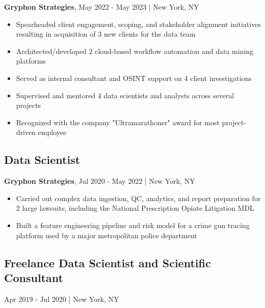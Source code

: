 \documentclass[11pt]{article}
\newenvironment{myitemize}
{ \begin{itemize}
	\setlength{\itemsep}{0pt}
	\setlength{\parskip}{0pt}
	\setlength{\parsep}{0pt}     }
{ \end{itemize}                  }
\begin{document}
{\bfseries Gryphon Strategies}, May 2022 - May 2023 | New York, NY
\begin{myitemize}
	\item Spearheaded client engagement, scoping, and stakeholder alignment initiatives resulting in acquisition of 3 new clients for the data team
	\item Architected/developed 2 cloud-based workflow automation and data mining platforms
	\item Served as internal consultant and OSINT support on 4 client investigations
	\item Supervised and mentored 4 data scientists and analysts across several projects
	\item Recognized with the company "Ultramarathoner" award for most project-driven employee
\end{myitemize}

\subsection*{Data Scientist}
\vspace{-3truemm}

{\bfseries Gryphon Strategies}, Jul 2020 - May 2022 | New York, NY
\begin{myitemize}
	\item Carried out complex data ingestion, QC, analytics, and report preparation for 2 large lawsuits, including the National Prescription Opiate Litigation MDL
	\item Built a feature engineering pipeline and risk model for a crime gun tracing platform used by a major metropolitan police department
\end{myitemize}

\subsection*{Freelance Data Scientist and Scientific Consultant}
\vspace{-3truemm}
Apr 2019 - Jul 2020 | New York, NY
\end{document}

